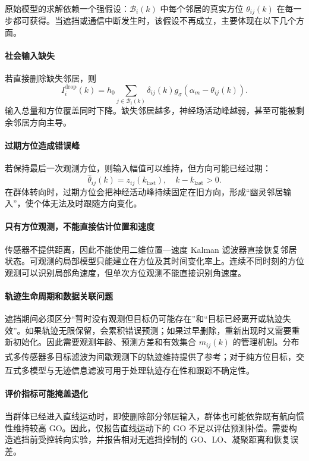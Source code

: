 \documentclass[UTF8,fontset=windows,11pt]{ctexart}
\newcommand{\upcite}[1]{\textsuperscript{\cite{#1}}}
\begin{document}
原始模型的求解依赖一个强假设：$\mathcal B_i(k)$ 中每个邻居的真实方位 $\theta_{ij}(k)$ 在每一步都可获得。当遮挡或通信中断发生时，该假设不再成立，主要体现在以下几个方面。

\paragraph{社会输入缺失}
若直接删除缺失邻居，则
\begin{equation}
 I_i^{\mathrm{drop}}(k)=
 h_0\sum_{j\in\mathcal B_i(k)}\delta_{ij}(k)
 g_\sigma(\alpha_m-\theta_{ij}(k)).
\end{equation}
输入总量和方位覆盖同时下降。缺失邻居越多，神经场活动峰越弱，甚至可能被剩余邻居方向主导。

\paragraph{过期方位造成错误峰}
若保持最后一次观测方位，则输入幅值可以维持，但方向可能已经过期：
\begin{equation}
 \hat\theta_{ij}(k)=z_{ij}(k_{\mathrm{last}}),
\quad k-k_{\mathrm{last}}>0.
\end{equation}
在群体转向时，过期方位会把神经活动峰持续固定在旧方向，形成“幽灵邻居输入”，使个体无法及时跟随方向变化。

\paragraph{只有方位观测，不能直接估计位置和速度}
传感器不提供距离，因此不能使用二维位置—速度 Kalman 滤波器直接恢复邻居状态。可观测的局部模型只能建立在方位及其时间变化率上。连续不同时刻的方位观测可以识别局部角速度，但单次方位观测不能直接识别角速度。

\paragraph{轨迹生命周期和数据关联问题}
遮挡期间必须区分“暂时没有观测但目标仍可能存在”和“目标已经离开或轨迹失效”。如果轨迹无限保留，会累积错误预测；如果过早删除，重新出现时又需要重新初始化。因此需要观测年龄、预测方差和有效集合 $m_{ij}(k)$ 的管理机制。分布式多传感器多目标滤波为间歇观测下的轨迹维持提供了参考\upcite{Qi2024}；对于纯方位目标，交互式多模型与无迹信息滤波可用于处理轨迹存在性和跟踪不确定性\upcite{Pan2026}。

\paragraph{评价指标可能掩盖退化}
当群体已经进入直线运动时，即使删除部分邻居输入，群体也可能依靠既有航向惯性维持较高 GO。因此，仅报告直线运动下的 GO 不足以评估预测补偿。需要构造遮挡前受控转向实验，并报告相对无遮挡控制的 GO、LO、凝聚距离和恢复误差。
\end{document}

